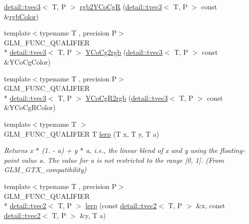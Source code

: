 \begin{DoxyCompactItemize}
\hyperlink{structglm_1_1detail_1_1tvec3}{detail\-::tvec3}$<$ T, P $>$ \hyperlink{group__gtx__color__space___y_co_cg_gaeee43c2a06fe63d46a96cee4d1c63ce6}{rgb2\-Y\-Co\-Cg\-R} (\hyperlink{structglm_1_1detail_1_1tvec3}{detail\-::tvec3}$<$ T, P $>$ const \&\hyperlink{group__gtx__color__space_gafe29cc37c2675aee66c9f9ae3e5e7294}{rgb\-Color})
\item 
{\footnotesize template$<$typename T , precision P$>$ }\\G\-L\-M\-\_\-\-F\-U\-N\-C\-\_\-\-Q\-U\-A\-L\-I\-F\-I\-E\-R \\*
\hyperlink{structglm_1_1detail_1_1tvec3}{detail\-::tvec3}$<$ T, P $>$ \hyperlink{group__gtx__color__space___y_co_cg_gab40e31e352d2d318d3f062df2882c500}{Y\-Co\-Cg2rgb} (\hyperlink{structglm_1_1detail_1_1tvec3}{detail\-::tvec3}$<$ T, P $>$ const \&Y\-Co\-Cg\-Color)
\item 
{\footnotesize template$<$typename T , precision P$>$ }\\G\-L\-M\-\_\-\-F\-U\-N\-C\-\_\-\-Q\-U\-A\-L\-I\-F\-I\-E\-R \\*
\hyperlink{structglm_1_1detail_1_1tvec3}{detail\-::tvec3}$<$ T, P $>$ \hyperlink{group__gtx__color__space___y_co_cg_ga7b90b9b5758dbe96a82a2ef8237a17e9}{Y\-Co\-Cg\-R2rgb} (\hyperlink{structglm_1_1detail_1_1tvec3}{detail\-::tvec3}$<$ T, P $>$ const \&Y\-Co\-Cg\-R\-Color)
\item 
\hypertarget{group__gtx__compatibility_ga5494ba3a95ea6594c86fc75236886864}{{\footnotesize template$<$typename T $>$ }\\G\-L\-M\-\_\-\-F\-U\-N\-C\-\_\-\-Q\-U\-A\-L\-I\-F\-I\-E\-R T \hyperlink{group__gtx__compatibility_ga5494ba3a95ea6594c86fc75236886864}{lerp} (T x, T y, T a)}\label{group__gtx__compatibility_ga5494ba3a95ea6594c86fc75236886864}

\begin{DoxyCompactList}\small\item\em Returns x $\ast$ (1. -\/ a) + y $\ast$ a, i.\-e., the linear blend of x and y using the floating-\/point value a. The value for a is not restricted to the range \mbox{[}0, 1\mbox{]}. (From G\-L\-M\-\_\-\-G\-T\-X\-\_\-compatibility) \end{DoxyCompactList}\item 
\hypertarget{group__gtx__compatibility_gad97d71f29fcd1d51a1857a74b67490a0}{{\footnotesize template$<$typename T , precision P$>$ }\\G\-L\-M\-\_\-\-F\-U\-N\-C\-\_\-\-Q\-U\-A\-L\-I\-F\-I\-E\-R \\*
\hyperlink{structglm_1_1detail_1_1tvec2}{detail\-::tvec2}$<$ T, P $>$ \hyperlink{group__gtx__compatibility_gad97d71f29fcd1d51a1857a74b67490a0}{lerp} (const \hyperlink{structglm_1_1detail_1_1tvec2}{detail\-::tvec2}$<$ T, P $>$ \&x, const \hyperlink{structglm_1_1detail_1_1tvec2}{detail\-::tvec2}$<$ T, P $>$ \&y, T a)}\label{group__gtx__compatibility_gad97d71f29fcd1d51a1857a74b67490a0}


\end{DoxyCompactItemize}
